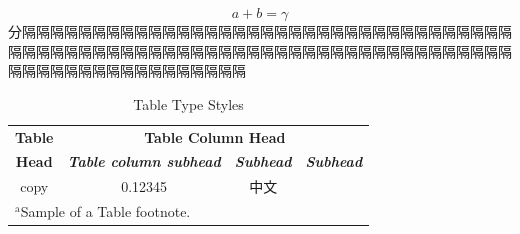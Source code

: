 \documentclass[UTF8,AutoFakeBold,a4paper,12pt]{article}
\begin{document}
\begin{equation}
    a+b=\gamma\label{eq1}
\end{equation}
分隔隔隔隔隔隔隔隔隔隔隔隔隔隔隔隔隔隔隔隔隔隔隔隔隔隔隔隔隔隔隔隔隔隔隔隔隔隔隔隔隔隔隔隔隔隔隔隔隔隔隔隔隔隔隔隔隔隔隔隔隔隔隔隔隔隔隔隔隔隔隔隔隔隔隔隔隔隔隔隔隔隔隔隔隔隔隔隔
\begin{table}[htbp]
    \caption{Table Type Styles}
    \centering
    \begin{tabular}{|c|c|c|c|}
        \hline
        \textbf{Table} & \multicolumn{3}{|c|}{\textbf{Table Column Head}}                                                         \\
        \cline{2-4}
        \textbf{Head}  & \textbf{\textit{Table column subhead}}           & \textbf{\textit{Subhead}} & \textbf{\textit{Subhead}} \\
        \hline
        copy           & 0.12345                   &     中文                     &                           \\
        \hline
        \multicolumn{4}{l}{$^{\mathrm{a}}$Sample of a Table footnote.}
    \end{tabular}
    \label{tab2}
\end{table}


\markright{} %

\markboth{}{} %

% 
% 
\end{document}
